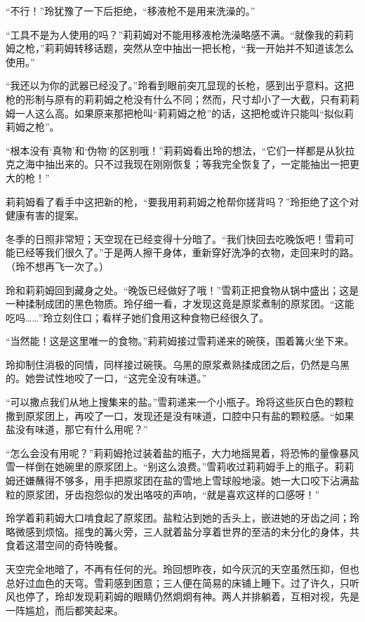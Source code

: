 “不行！”玲犹豫了一下后拒绝，“移液枪不是用来洗澡的。”

“工具不是为人使用的吗？”莉莉姆对不能用移液枪洗澡略感不满。“就像我的莉莉姆之枪，”莉莉姆转移话题，突然从空中抽出一把长枪，“我一开始并不知道该怎么使用。”

“我还以为你的武器已经没了。”玲看到眼前突兀显现的长枪，感到出乎意料。这把枪的形制与原有的莉莉姆之枪没有什么不同；然而，尺寸却小了一大截，只有莉莉姆一人这么高。如果原来那把枪叫“莉莉姆之枪”的话，这把枪或许只能叫“拟似莉莉姆之枪”。

“根本没有‘真物’和‘伪物’的区别哦！”莉莉姆看出玲的想法，“它们一样都是从狄拉克之海中抽出来的。只不过我现在刚刚恢复；等我完全恢复了，一定能抽出一把更大的枪！”

莉莉姆看了看手中这把新的枪，“要我用莉莉姆之枪帮你搓背吗？”玲拒绝了这个对健康有害的提案。

冬季的日照非常短；天空现在已经变得十分暗了。“我们快回去吃晚饭吧！雪莉可能已经等我们很久了。”于是两人擦干身体，重新穿好洗净的衣物，走回来时的路。（玲不想再飞一次了。）

玲和莉莉姆回到藏身之处。“晚饭已经做好了哦！”雪莉正把食物从锅中盛出；这是一种揉制成团的黑色物质。玲仔细一看，才发现这竟是原浆煮制的原浆团。“这能吃吗……”玲立刻住口；看样子她们食用这种食物已经很久了。

“当然能！这是这里唯一的食物。”莉莉姆接过雪莉递来的碗筷，围着篝火坐下来。

玲抑制住消极的同情，同样接过碗筷。乌黑的原浆煮熟揉成团之后，仍然是乌黑的。她尝试性地咬了一口，“这完全没有味道。”

“可以撒点我们从地上搜集来的盐。”雪莉递来一个小瓶子。玲将这些灰白色的颗粒撒到原浆团上，再咬了一口，发现还是没有味道，口腔中只有盐的颗粒感。“如果盐没有味道，那它有什么用呢？”

“怎么会没有用呢？”莉莉姆抢过装着盐的瓶子，大力地摇晃着，将恐怖的量像暴风雪一样倒在她碗里的原浆团上。“别这么浪费。”雪莉收过莉莉姆手上的瓶子。莉莉姆还嫌蘸得不够多，用手把原浆团在盐的雪地上雪球般地滚。她一大口咬下沾满盐粒的原浆团，牙齿抱怨似的发出咯吱的声响，“就是喜欢这样的口感呀！”

玲学着莉莉姆大口啃食起了原浆团。盐粒沾到她的舌头上，嵌进她的牙齿之间；玲略微感到烦恼。摇曳的篝火旁，三人就着盐分享着世界的至洁的未分化的身体，共食着这潜空间的奇特晚餐。

天空完全地暗了，不再有任何的光。玲回想昨夜，如今灰沉的天空虽然压抑，但也总好过血色的天穹。雪莉感到困意；三人便在简易的床铺上睡下。过了许久，只听风也停了，玲却发现莉莉姆的眼睛仍然炯炯有神。两人并排躺着，互相对视，先是一阵尴尬，而后都笑起来。

